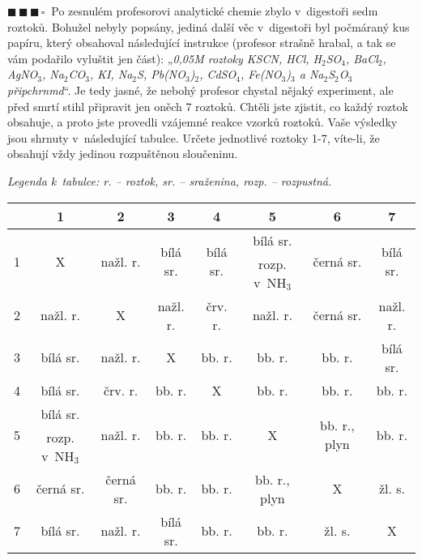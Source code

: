 \documentclass{book}
\newcommand{\tri}{$\blacksquare \, \blacksquare \, \blacksquare \, \square \; \; $}
\renewenvironment{quotation}{\par}{\par} %
\begin{document}
\hrulefill %
\begin{quotation}
\tri Po zesnulém profesorovi analytické chemie zbylo v~digestoři sedm roztoků.
Bohužel nebyly popsány, jediná další věc v~digestoři byl počmáraný
kus papíru, který obsahoval následující instrukce (profesor strašně
hrabal, a tak se vám podařilo vyluštit jen část): „\textit{0,05M roztoky
KSCN, HCl, H$_{2}$SO$_{4}$, BaCl$_{2}$, AgNO$_{3}$, Na$_{2}$CO$_{3}$,
KI, Na$_{2}$S, Pb(NO$_{3}$)$_{2}$, CdSO$_{4}$, Fe(NO$_{3}$)$_{3}$
a Na$_{2}$S$_{2}$O$_{3}$ připchrnmd}“. Je tedy jasné, že nebohý
profesor chystal nějaký experiment, ale před smrtí stihl připravit
jen oněch 7 roztoků. Chtěli jste zjistit, co každý roztok obsahuje,
a proto jste provedli vzájemné reakce vzorků roztoků. Vaše výsledky
jsou shrnuty v~následující tabulce. Určete jednotlivé roztoky 1-7,
víte-li, že obsahují vždy jedinou rozpuštěnou sloučeninu.

\textit{Legenda k~tabulce: r. -- roztok, sr. -- sraženina, rozp. -- rozpustná.}

\begin{center}
\begin{tabular}{c|c|c|c|c|c|c|c}
 
 & 1 & 2 & 3 & 4 & 5 & 6 & 7\tabularnewline

\hline 
\multirow{2}{*}{1} & \multirow{2}{*}{X} & \multirow{2}{*}{nažl. r.} & \multirow{2}{*}{bílá sr.} & \multirow{2}{*}{bílá sr.} & bílá sr. & \multirow{2}{*}{černá sr.} & \multirow{2}{*}{bílá sr.}\tabularnewline
 &  &  &  &  & rozp. v~NH$_{3}$ &  & \tabularnewline
\hline 
2 & nažl. r. & X & nažl. r. & črv. r. & nažl. r. & černá sr. & nažl. r.\tabularnewline
\hline 
3 & bílá sr. & nažl. r. & X & bb. r. & bb. r. & bb. r. & bílá sr.\tabularnewline
\hline 
4 & bílá sr. & črv. r. & bb. r. & X & bb. r. & bb. r. & bb. r.\tabularnewline
\hline 
\multirow{2}{*}{5} & bílá sr. & \multirow{2}{*}{nažl. r.} & \multirow{2}{*}{bb. r.} & \multirow{2}{*}{bb. r.} & \multirow{2}{*}{X} & \multirow{2}{*}{bb. r., plyn} & \multirow{2}{*}{bb. r.}\tabularnewline
 & rozp. v~NH$_{3}$ &  &  &  &  &  & \tabularnewline
\hline 
6 & černá sr. & černá sr. & bb. r. & bb. r. & bb. r., plyn & X & žl. s.\tabularnewline
\hline 
7 & bílá sr. & nažl. r. & bílá sr. & bb. r. & bb. r. & žl. s. & X\tabularnewline

\end{tabular}
\par\end{center}

\end{quotation} \dotfill \par 
\end{document}
